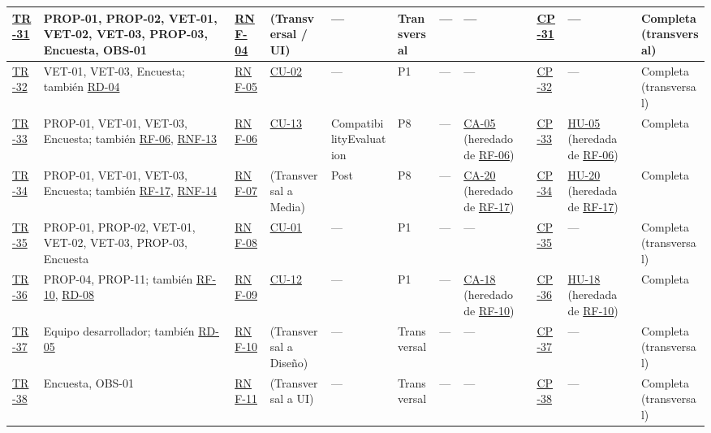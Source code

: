 \documentclass[journal,onecolumn]{IEEEtran}
\begin{document}
\begin{landscape}
\begin{longtable}{@{}p{0.8cm} p{4.0cm} p{1.3cm} p{1.7cm} p{2.5cm} p{1.0cm} p{1.9cm} p{0.9cm} p{0.9cm} p{1.75cm} p{2.2cm}@{}}
			\hyperref[tr:31]{TR-31}\label{tr:31} & PROP-01, PROP-02, VET-01, VET-02, VET-03, PROP-03, Encuesta, OBS-01 & \hyperref[tab:RNF-04]{RNF-04} & (Transversal / UI) & --- & Transversal & --- & --- & \hyperref[cp:31]{CP-31} & --- & Completa (transversal) \\ \midrule
			\hyperref[tr:32]{TR-32}\label{tr:32} & VET-01, VET-03, Encuesta; también \hyperref[tab:RD-04]{RD-04} & \hyperref[tab:RNF-05]{RNF-05} & \hyperref[tab:CU-02]{CU-02} & --- & P1 & --- & --- & \hyperref[cp:32]{CP-32} & --- & Completa (transversal) \\ \midrule
			\hyperref[tr:33]{TR-33}\label{tr:33} & PROP-01, VET-01, VET-03, Encuesta; también \hyperref[tab:RF-06]{RF-06}, \hyperref[tab:RNF-13]{RNF-13} & \hyperref[tab:RNF-06]{RNF-06} & \hyperref[tab:CU-13]{CU-13} & CompatibilityEvaluation & P8 & --- & \hyperref[lst:ca05]{CA-05} (heredado de \hyperref[tab:RF-06]{RF-06}) & \hyperref[tab:CP-33]{CP-33} & \hyperref[tab:HU-05]{HU-05} (heredada de \hyperref[tab:RF-06]{RF-06}) & Completa \\ \midrule
			\hyperref[tr:34]{TR-34}\label{tr:34} & PROP-01, VET-01, VET-03, Encuesta; también \hyperref[tab:RF-17]{RF-17}, \hyperref[tab:RNF-14]{RNF-14} & \hyperref[tab:RNF-07]{RNF-07} & (Transversal a Media) & Post & P8 & --- & \hyperref[lst:ca20]{CA-20} (heredado de \hyperref[tab:RF-17]{RF-17}) & \hyperref[cp:34]{CP-34} & \hyperref[tab:HU-20]{HU-20} (heredada de \hyperref[tab:RF-17]{RF-17}) & Completa \\ \midrule
			\hyperref[tr:35]{TR-35}\label{tr:35} & PROP-01, PROP-02, VET-01, VET-02, VET-03, PROP-03, Encuesta & \hyperref[tab:RNF-08]{RNF-08} & \hyperref[tab:CU-01]{CU-01} & --- & P1 & --- & --- & \hyperref[cp:35]{CP-35} & --- & Completa (transversal) \\ \midrule
			\hyperref[tr:36]{TR-36}\label{tr:36} & PROP-04, PROP-11; también \hyperref[tab:RF-10]{RF-10}, \hyperref[tab:RD-08]{RD-08} & \hyperref[tab:RNF-09]{RNF-09} & \hyperref[tab:CU-12]{CU-12} & --- & P1 & --- & \hyperref[lst:ca18]{CA-18} (heredado de \hyperref[tab:RF-10]{RF-10}) & \hyperref[cp:36]{CP-36} & \hyperref[tab:HU-18]{HU-18} (heredada de \hyperref[tab:RF-10]{RF-10}) & Completa \\ \midrule
			\hyperref[tr:37]{TR-37}\label{tr:37} & Equipo desarrollador; también \hyperref[tab:RD-05]{RD-05} & \hyperref[tab:RNF-10]{RNF-10} & (Transversal a Diseño) & --- & Transversal & --- & --- & \hyperref[cp:37]{CP-37} & --- & Completa (transversal) \\ \midrule
			\hyperref[tr:38]{TR-38}\label{tr:38} & Encuesta, OBS-01 & \hyperref[tab:RNF-11]{RNF-11} & (Transversal a UI) & --- & Transversal & --- & --- & \hyperref[cp:38]{CP-38} & --- & Completa (transversal) \\ \midrule

\end{longtable}
\end{landscape}
\end{document}
